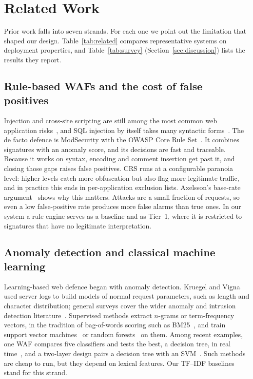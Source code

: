 \documentclass[preprint,11pt]{elsarticle}
\begin{document}
\section{Related Work}
\label{sec:related}
Prior work falls into seven strands. For each one we point out the
limitation that shaped our design. Table~\ref{tab:related} compares
representative systems on deployment properties, and
Table~\ref{tab:survey} (Section~\ref{sec:discussion}) lists the results
they report.

\subsection{Rule-based WAFs and the cost of false positives}
Injection and cross-site scripting are still among the most common web
application risks~\cite{owasptop10}, and SQL injection by itself takes many
syntactic forms~\cite{halfond2006sqli}. The de facto defence is ModSecurity
with the OWASP Core Rule Set~\cite{owaspcrs}. It combines signatures with
an anomaly score, and its decisions are fast and traceable. Because it
works on syntax, encoding and comment insertion get past it, and closing
those gaps raises false positives. CRS runs at a configurable paranoia
level: higher levels catch more obfuscation but also flag more legitimate
traffic, and in practice this ends in per-application exclusion lists.
Axelsson's base-rate argument~\cite{axelsson2000baserate} shows why this
matters. Attacks are a small fraction of requests, so even a low
false-positive rate produces more false alarms than true ones. In our
system a rule engine serves as a baseline and as Tier~1, where it is
restricted to signatures that have no legitimate interpretation.

\subsection{Anomaly detection and classical machine learning}
Learning-based web defence began with anomaly detection. Kruegel and
Vigna~\cite{kruegel2003anomaly} used server logs to build models of normal
request parameters, such as length and character distribution; general
surveys cover the wider anomaly and intrusion detection
literature~\cite{chandola2009anomaly,buczak2016survey}. Supervised methods
extract $n$-grams or term-frequency vectors, in the tradition of
bag-of-words scoring such as BM25~\cite{robertson2009bm25}, and train
support vector machines~\cite{cortes1995svm,joachims1998text} or random
forests~\cite{breiman2001rf} on them. Among recent examples, one WAF
compares five classifiers and tests the best, a decision tree, in real
time~\cite{mlwaf2025peerj}, and a two-layer design pairs a decision tree
with an SVM~\cite{adlwaf2025}. Such methods are cheap to run, but they
depend on lexical features. Our TF--IDF baselines stand for this strand.
\end{document}
